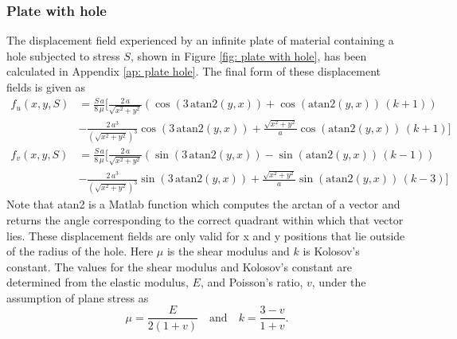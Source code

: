 \documentclass[12pt,oneside,openany,a4paper, %
english, %
masters-t, goldenblock]{usthesis}
\begin{document}
\subsubsection{Plate with hole}
\label{sec: plate hole}
The displacement field experienced by an infinite plate of material containing a hole subjected to stress $S$, shown in Figure \ref{fig: plate with hole}, has been calculated in Appendix \ref{ap: plate hole}. The final form of these displacement fields is given as 
\begin{align}
  f_u(x,y,S) &= \frac{S\,a}{8\,\mu } \bigg[\frac{2\,a}{\sqrt{x^2+y^2}} \left(\cos\left(3\,\text{atan2}(y,x) \right)+\cos\left( \text{atan2}(y,x) \right)\,\left(k+1\right)\right) \nonumber \\ &-\frac{2\,a^3}{\left( \sqrt{x^2+y^2} \right) ^3} \cos\left(3\, \text{atan2}(y,x) \right)+\frac{\sqrt{x^2+y^2}}{a} \cos\left( \text{atan2}(y,x) \right)\,\left(k+1\right)  \bigg] \\
  f_v(x,y,S) &= \frac{S\,a}{8\,\mu } \bigg[\frac{2\,a}{\sqrt{x^2+y^2}} \left(\sin\left(3\, \text{atan2}(y,x) \right)-\sin\left( \text{atan2}(y,x) \right)\,\left(k-1\right)\right) \nonumber \\ &-\frac{2\,a^3}{ \left( \sqrt{x^2+y^2} \right)^3} \sin\left(3\, \text{atan2}(y,x) \right) +\frac{\sqrt{x^2+y^2}}{a} \sin\left( \text{atan2}(y,x) \right)\,\left(k-3\right)  \bigg]
\end{align}
Note that atan2 is a Matlab function which computes the arctan of a vector and returns the angle corresponding to the correct quadrant within which that vector lies. These displacement fields are only valid for x and y positions that lie outside of the radius of the hole. Here $\mu$ is the shear modulus and $k$ is Kolosov's constant. The values for the shear modulus and Kolosov's constant are determined from the elastic modulus, $E$, and Poisson's ratio, $v$, under the assumption of plane stress as
\begin{equation}
\label{eq: shear kolosovs}
   \mu=\frac{E}{2(1+v)} \quad \text{and} \quad k=\frac{3-v}{1+v}.
\end{equation} 



\end{document}
